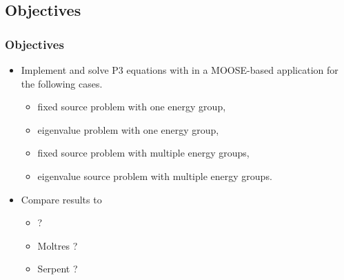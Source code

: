 \subsection{Objectives}
\begin{frame}
\frametitle{Objectives}
  \begin{itemize}
    \item Implement and solve P3 equations with in a MOOSE-based application for the following cases.
	\begin{itemize}
		\item fixed source problem with one energy group,
		\item eigenvalue problem with one energy group,
		\item fixed source problem with multiple energy groups,
		\item eigenvalue source problem with multiple energy groups.
	\end{itemize}
    \item Compare results to
	\begin{itemize}
		\item ?
		\item Moltres ?
		\item Serpent ?
	\end{itemize}
  \end{itemize}
\end{frame}


